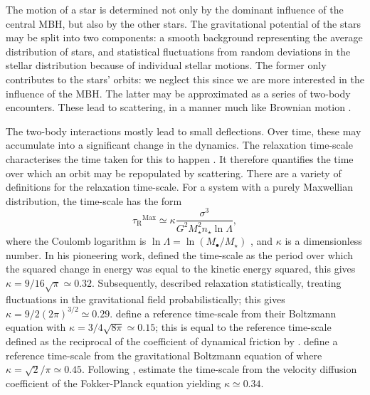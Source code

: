 \documentclass[useAMS,usedcolumn,usegraphicx,usenatbib]{mn2e}
\newcommand{\sub}[1]{\ensuremath{_\mathrm{#1}}}
\newcommand{\super}[1]{\ensuremath{^\mathrm{#1}}}
\begin{document}
The motion of a star is determined not only by the dominant influence of the central MBH, but also by the other stars. The gravitational potential of the stars may be split into two components: a smooth background representing the average distribution of stars, and statistical fluctuations from random deviations in the stellar distribution because of individual stellar motions. The former only contributes to the stars' orbits: we neglect this since we are more interested in the influence of the MBH. The latter may be approximated as a series of two-body encounters. These lead to scattering, in a manner much like Brownian motion \citep{Bekenstein1992,Maoz1993,Nelson1999}.

The two-body interactions mostly lead to small deflections. Over time, these may accumulate into a significant change in the dynamics. The relaxation time-scale characterises the time taken for this to happen \citep[section 1.2.1]{Binney2008}. It therefore quantifies the time over which an orbit may be repopulated by scattering. There are a variety of definitions for the relaxation time-scale. For a system with a purely Maxwellian distribution, the time-scale has the form
\begin{equation}
\tau\sub{R}\super{Max} \simeq \kappa\frac{\sigma^3}{G^2M_\star^2 n_\star\ln\Lambda},
\label{eq:tauMaxwell}
\end{equation}
where the Coulomb logarithm is $\ln\Lambda = \ln(M_\bullet/M_\star)$ \citep{Bahcall1976}, and $\kappa$ is a dimensionless number. In his pioneering work, \citet{Chandrasekhar1941, Chandrasekhar1960} defined the time-scale as the period over which the squared change in energy was equal to the kinetic energy squared, this gives $\kappa = 9/16\sqrt{\pi} \simeq 0.32$. Subsequently, \citet{Chandrasekhar1941a} described relaxation statistically, treating fluctuations in the gravitational field probabilistically; this gives $\kappa = 9/2(2\pi)^{3/2} \simeq 0.29$. \citet{Bahcall1977} define a reference time-scale from their Boltzmann equation with $\kappa = 3/4\sqrt{8\pi} \simeq 0.15$; this is equal to the reference time-scale defined as the reciprocal of the coefficient of dynamical friction by \citet{Chandrasekhar1943a, Chandrasekhar1943}. \citet{Spitzer1958} define a reference time-scale from the gravitational Boltzmann equation of \citet{Spitzer1951} where $\kappa = \sqrt{2}/\pi \simeq 0.45$. Following \citet{Spitzer1971}, \citet[section 7.4.5]{Binney2008} estimate the time-scale from the velocity diffusion coefficient of the Fokker-Planck equation yielding $\kappa \simeq 0.34$.
\end{document}
